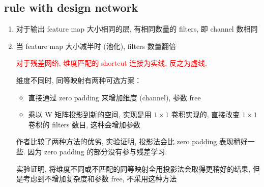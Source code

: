 \documentclass[12pt]{ctexart}%
\begin{document}
		\subsection{\quad rule with design network}
			\begin{enumerate}
				\item 对于输出 feature map 大小相同的层, 有相同数量的 filters, 即 channel 数相同
				
				\item 当 feature map 大小减半时 (池化), filters 数量翻倍
					
						\textcolor{red}{对于残差网络, 维度匹配的 shortcut 连接为实线, 反之为虚线.}
						
						维度不同时, 同等映射有两种可选方案：
							\begin{itemize}
								\item 直接通过 zero padding 来增加维度 (channel), 参数 free
								
								\item 乘以 W 矩阵投影到新的空间, 实现是用 $1\times 1$ 卷积实现的, 直接改变 $1 \times 1$ 卷积的 filters 数目, 这种会增加参数
							\end{itemize}
						作者比较了两种方法的优劣, 实验证明, 投影法会比 zero padding 表现稍好一些. 因为 zero padding 的部分没有参与残差学习. 
						
						实验证明, 将维度不同或不匹配的同等映射全用投影法会取得更稍好的结果, 但是考虑到不增加复杂度和参数 free, 不采用这种方法	
					

\end{enumerate}
\end{document}
